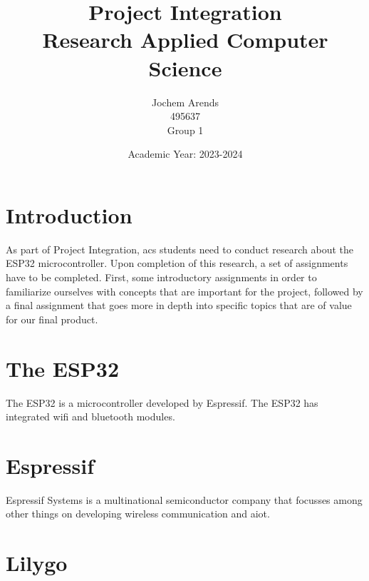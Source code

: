 \documentclass{article}
\title{Project Integration \\ Research Applied Computer Science}
\author{Jochem Arends \\ 495637 \\ Group 1}
\date{Academic Year: 2023-2024}
\begin{document}
\maketitle
\newpage

\tableofcontents
\clearpage

\printglossary[type=\acronymtype,{title=Abbreviations}]
\printglossary[type=main]


\clearpage

\section{Introduction}
As part of Project Integration, \gls{acs} students need to conduct research about the ESP32 microcontroller.
Upon completion of this research, a set of assignments have to be completed.
First, some introductory assignments in order to familiarize ourselves with concepts that are important for the project, followed by a final assignment that goes more in depth into specific topics that are of value for our final product.

\section{The ESP32}
The ESP32 is a microcontroller developed by Espressif.
The ESP32 has integrated \gls{wifi} and \gls{bluetooth} modules.

\section{Espressif}
Espressif Systems is a multinational semiconductor company that focusses among other things on developing wireless communication and \gls{aiot}.
\cite{aboutespressif}

\section {Lilygo}
\clearpage





\end{document}

